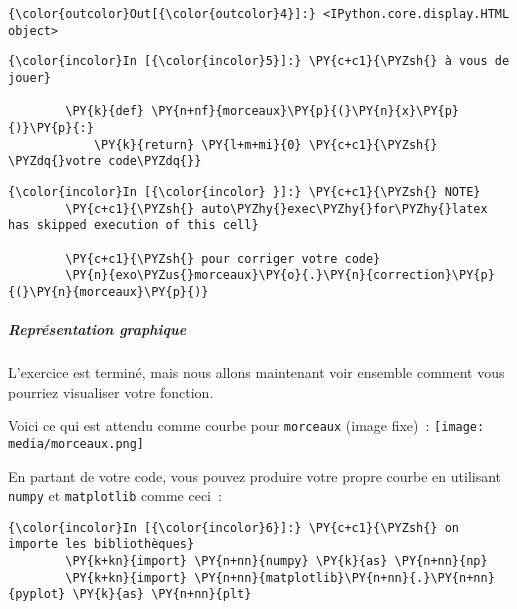 \begin{Verbatim}[commandchars=\\\{\},frame=single,framerule=0.3mm,rulecolor=\color{cellframecolor}]
{\color{outcolor}Out[{\color{outcolor}4}]:} <IPython.core.display.HTML object>
\end{Verbatim}
            
    \begin{Verbatim}[commandchars=\\\{\},frame=single,framerule=0.3mm,rulecolor=\color{cellframecolor}]
{\color{incolor}In [{\color{incolor}5}]:} \PY{c+c1}{\PYZsh{} à vous de jouer}
        
        \PY{k}{def} \PY{n+nf}{morceaux}\PY{p}{(}\PY{n}{x}\PY{p}{)}\PY{p}{:}
            \PY{k}{return} \PY{l+m+mi}{0} \PY{c+c1}{\PYZsh{} \PYZdq{}votre code\PYZdq{}}
\end{Verbatim}


    \begin{Verbatim}[commandchars=\\\{\},frame=single,framerule=0.3mm,rulecolor=\color{cellframecolor}]
{\color{incolor}In [{\color{incolor} }]:} \PY{c+c1}{\PYZsh{} NOTE}
        \PY{c+c1}{\PYZsh{} auto\PYZhy{}exec\PYZhy{}for\PYZhy{}latex has skipped execution of this cell}
        
        \PY{c+c1}{\PYZsh{} pour corriger votre code}
        \PY{n}{exo\PYZus{}morceaux}\PY{o}{.}\PY{n}{correction}\PY{p}{(}\PY{n}{morceaux}\PY{p}{)}
\end{Verbatim}


    \hypertarget{repruxe9sentation-graphique}{%
\subparagraph{Représentation
graphique}\label{repruxe9sentation-graphique}}

    L'exercice est terminé, mais nous allons maintenant voir ensemble
comment vous pourriez visualiser votre fonction.

Voici ce qui est attendu comme courbe pour \texttt{morceaux} (image
fixe)~: \texttt{[image: media/morceaux.png]}

    En partant de votre code, vous pouvez produire votre propre courbe en
utilisant \texttt{numpy} et \texttt{matplotlib} comme ceci~:

    \begin{Verbatim}[commandchars=\\\{\},frame=single,framerule=0.3mm,rulecolor=\color{cellframecolor}]
{\color{incolor}In [{\color{incolor}6}]:} \PY{c+c1}{\PYZsh{} on importe les bibliothèques}
        \PY{k+kn}{import} \PY{n+nn}{numpy} \PY{k}{as} \PY{n+nn}{np}
        \PY{k+kn}{import} \PY{n+nn}{matplotlib}\PY{n+nn}{.}\PY{n+nn}{pyplot} \PY{k}{as} \PY{n+nn}{plt}
\end{Verbatim}


